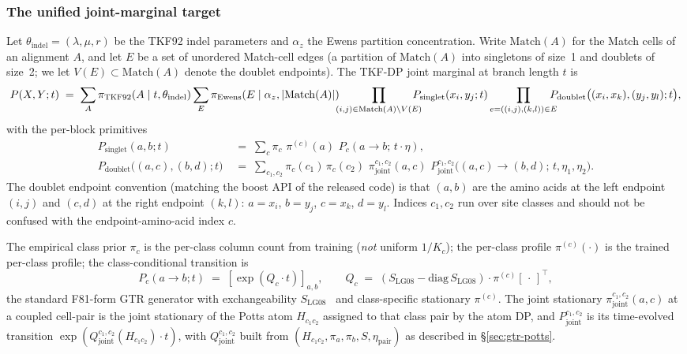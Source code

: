 \subsubsection*{The unified joint-marginal target}

Let $\theta_{\mathrm{indel}} = (\lambda, \mu, r)$ be the TKF92
indel parameters and $\alpha_z$ the Ewens partition concentration.
Write $\mathrm{Match}(A)$ for the Match cells of an alignment $A$,
and let $E$ be a set of unordered Match-cell edges (a partition of
$\mathrm{Match}(A)$ into singletons of size~1 and doublets of
size~2; we let $V(E) \subset \mathrm{Match}(A)$ denote the doublet
endpoints). The TKF-DP joint marginal at branch length $t$ is
\begin{equation}
\label{eq:tkfdp-joint-marginal}
P(X, Y; t) \;=\; \sum_A \pi_{\TKF92}(A \mid t, \theta_{\mathrm{indel}})
  \sum_E \pi_{\mathrm{Ewens}}(E \mid \alpha_z, |\mathrm{Match}(A)|)
  \!\!\!\prod_{(i, j) \in \mathrm{Match}(A) \setminus V(E)}\!\!\!\!\!\!
    P_{\mathrm{singlet}}(x_i, y_j; t)
  \prod_{e = ((i, j), (k, l)) \in E}\!\!\!\!\!
    P_{\mathrm{doublet}}\bigl((x_i, x_k), (y_j, y_l); t\bigr),
\end{equation}
with the per-block primitives
\begin{align}
P_{\mathrm{singlet}}(a, b; t)
  \;&=\; \sum_c \pi_c \,\, \pi^{(c)}(a) \,\, P_c(a \to b;\, t \cdot \eta),
  \label{eq:p-singlet} \\
P_{\mathrm{doublet}}\bigl((a, c), (b, d); t\bigr)
  \;&=\; \sum_{c_1, c_2} \pi_c(c_1) \, \pi_c(c_2)
  \,\, \pi_{\mathrm{joint}}^{c_1, c_2}(a, c)
  \,\, P_{\mathrm{joint}}^{c_1, c_2}\!\bigl((a, c) \to (b, d);\, t, \eta_1, \eta_2\bigr).
  \label{eq:p-doublet}
\end{align}
The doublet endpoint convention (matching the boost API of the
released code) is that $(a, b)$ are the amino acids at the left
endpoint $(i, j)$ and $(c, d)$ at the right endpoint $(k, l)$:
$a = x_i$, $b = y_j$, $c = x_k$, $d = y_l$. Indices $c_1, c_2$ run
over site classes and should not be confused with the
endpoint-amino-acid index $c$.

The empirical class prior $\pi_c$ is the per-class column count
from training (\emph{not} uniform $1 / K_c$); the per-class profile
$\pi^{(c)}(\cdot)$ is the trained per-class profile; the
class-conditional transition is
\begin{equation}
\label{eq:p-class-cond}
P_c(a \to b; t) \;=\; [\exp(Q_c \cdot t)]_{a, b},
\qquad
Q_c \;=\; (S_{\mathrm{LG08}} - \mathrm{diag}\, S_{\mathrm{LG08}})
          \cdot \pi^{(c)}\![\,\cdot\,]^\top,
\end{equation}
the standard F81-form GTR generator with exchangeability
$S_{\mathrm{LG08}}$~\citep{LG08} and class-specific stationary
$\pi^{(c)}$. The joint stationary
$\pi_{\mathrm{joint}}^{c_1, c_2}(a, c)$ at a coupled cell-pair is
the joint stationary of the Potts atom $H_{c_1 c_2}$ assigned to that
class pair by the atom DP, and $P_{\mathrm{joint}}^{c_1, c_2}$ is its
time-evolved transition
$\exp(Q_{\mathrm{joint}}^{c_1, c_2}(H_{c_1 c_2}) \cdot t)$, with
$Q_{\mathrm{joint}}^{c_1, c_2}$ built from
$(H_{c_1 c_2}, \pi_a, \pi_b, S, \eta_{\mathrm{pair}})$
as described in \S\ref{sec:gtr-potts}.

